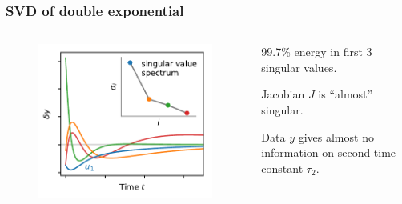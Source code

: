 \documentclass[xcolor={dvipsnames}]{beamer}
\begin{document}
\begin{frame}
\frametitle{SVD of double exponential}
\vspace{-0.25in}
\begin{columns}
    \begin{figure}
    \includegraphics[width=\textwidth]{figs/double-expon-svd.pdf}
    \end{figure}
    \vspace{-0.3in}
    \begin{block}{}
    99.7\% energy in first 3 singular values.

    Jacobian $J$ is ``almost'' singular.

    Data $y$ gives almost no information on second time constant $\tau_2$.
    \end{block}


\end{columns}
\end{frame}
\end{document}
